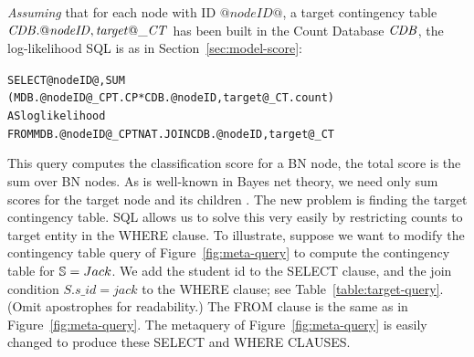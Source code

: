 \documentclass{acm_proc_article-sp}
\begin{document}
{\em Assuming} that for each node with ID $@nodeID@$, a target contingency table $\CDB.@nodeID,target@\_\cttable$ has been built in the Count Database $\CDB$, the log-likelihood SQL is as in Section~\ref{sec:model-score}:
\begin{alltt}
SELECT @nodeID@,  SUM
(MDB.@nodeID@\_CPT.CP * CDB.@nodeID,target@\_CT.count) 
AS loglikelihood
FROM MDB.@nodeID@\_CPT NAT. JOIN CDB.@nodeID,target@\_CT
\end{alltt}
This query computes the classification score for a BN node, the total score is the sum over BN nodes. As is well-known in Bayes net theory, we need only sum scores for the target node and its children \cite{Neapolitan2004}. 
%
The new problem is finding the target contingency table. SQL allows us to solve this very easily by restricting counts to target entity in the WHERE clause. To illustrate, suppose we want to modify the contingency table query of Figure~\ref{fig:meta-query} to compute the contingency table for $\S = Jack$. We add the student id to the SELECT clause, and the join condition $S.s\_id = jack$ to the WHERE clause; see Table~\ref{table:target-query}. (Omit apostrophes for readability.) The FROM clause is the same as in Figure~\ref{fig:meta-query}. The metaquery of Figure~\ref{fig:meta-query} is easily changed to produce these SELECT and WHERE CLAUSES. 


%
%
%
\end{document}
